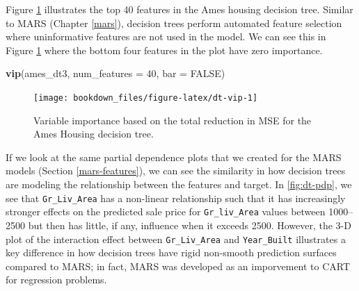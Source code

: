 \documentclass[]{krantz}
\makeatletter
\newenvironment{Shaded}{\begin{snugshade}}{\end{snugshade}}
\newcommand{\DataTypeTok}[1]{\textcolor[rgb]{0.27,0.27,0.27}{#1}}
\newcommand{\DecValTok}[1]{\textcolor[rgb]{0.06,0.06,0.06}{#1}}
\newcommand{\KeywordTok}[1]{\textcolor[rgb]{0.27,0.27,0.27}{\textbf{#1}}}
\newcommand{\NormalTok}[1]{#1}
\newcommand{\OtherTok}[1]{\textcolor[rgb]{0.37,0.37,0.37}{#1}}
\newenvironment{kframe}{%
\medskip{}
\setlength{\fboxsep}{.8em}
 \def\at@end@of@kframe{}%
 \ifinner\ifhmode%
  \def\at@end@of@kframe{\end{minipage}}%
  \begin{minipage}{\columnwidth}%
 \fi\fi%
 \def\FrameCommand##1{\hskip\@totalleftmargin \hskip-\fboxsep
 \colorbox{shadecolor}{##1}\hskip-\fboxsep
     \hskip-\linewidth \hskip-\@totalleftmargin \hskip\columnwidth}%
 \MakeFramed {\advance\hsize-\width
   \@totalleftmargin\z@ \linewidth\hsize
   \@setminipage}}%
 {\par\unskip\endMakeFramed%
 \at@end@of@kframe}
\renewenvironment{Shaded}{\begin{kframe}}{\end{kframe}}
\makeatother
\begin{document}
Figure \ref{fig:dt-vip} illustrates the top 40 features in the Ames housing decision tree. Similar to MARS (Chapter \ref{mars}), decision trees perform automated feature selection where uninformative features are not used in the model. We can see this in Figure \ref{fig:dt-vip} where the bottom four features in the plot have zero importance.

\begin{Shaded}
\begin{Highlighting}[]
\KeywordTok{vip}\NormalTok{(ames_dt3, }\DataTypeTok{num_features =} \DecValTok{40}\NormalTok{, }\DataTypeTok{bar =} \OtherTok{FALSE}\NormalTok{)}
\end{Highlighting}
\end{Shaded}

\begin{figure}

{\centering \texttt{[image: bookdown\_files/figure-latex/dt-vip-1]} 

}

\caption{Variable importance based on the total reduction in MSE for the Ames Housing decision tree.}\label{fig:dt-vip}
\end{figure}

If we look at the same partial dependence plots that we created for the MARS models (Section \ref{mars-features}), we can see the similarity in how decision trees are modeling the relationship between the features and target. In \ref{fig:dt-pdp}, we see that \texttt{Gr\_Liv\_Area} has a non-linear relationship such that it has increasingly stronger effects on the predicted sale price for \texttt{Gr\_liv\_Area} values between 1000--2500 but then has little, if any, influence when it exceeds 2500. However, the 3-D plot of the interaction effect between \texttt{Gr\_Liv\_Area} and \texttt{Year\_Built} illustrates a key difference in how decision trees have rigid non-smooth prediction surfaces compared to MARS; in fact, MARS was developed as an imporvement to CART for regression problems.
\end{document}
